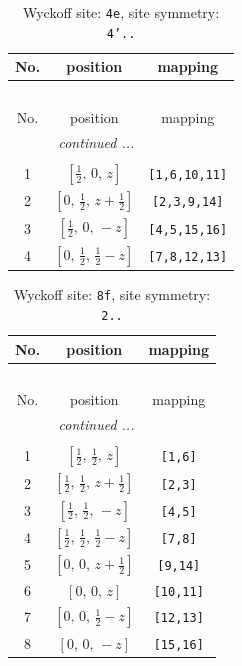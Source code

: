 \documentclass[fleqn,8pt]{jsarticle}
\begin{document}
\renewcommand{\arraystretch}{1.2}
\begin{longtable}{ccc}
\caption{Wyckoff site: {\tt 4e}, site symmetry: {\tt 4'..}}
 \\
 \hline \hline
No. & position & mapping \\ \hline \endfirsthead

\multicolumn{2}{l}{\tablename\ \thetable{}} \\
 \hline \hline
No. & position & mapping \\ \hline \endhead

 \hline \hline
\multicolumn{2}{r}{\footnotesize\it continued ...} \\ \endfoot

 \hline \hline
\multicolumn{2}{r}{} \\ \endlastfoot

1 & $\left[ \frac{1}{2},\, 0,\, z \right]$ & {\tt [1,6,10,11]} \\ \hline
2 & $\left[ 0,\, \frac{1}{2},\, z + \frac{1}{2} \right]$ & {\tt [2,3,9,14]} \\ \hline
3 & $\left[ \frac{1}{2},\, 0,\, - z \right]$ & {\tt [4,5,15,16]} \\ \hline
4 & $\left[ 0,\, \frac{1}{2},\, \frac{1}{2} - z \right]$ & {\tt [7,8,12,13]} \\
\end{longtable}
\renewcommand{\arraystretch}{1.2}
\begin{longtable}{ccc}
\caption{Wyckoff site: {\tt 8f}, site symmetry: {\tt 2..}}
 \\
 \hline \hline
No. & position & mapping \\ \hline \endfirsthead

\multicolumn{2}{l}{\tablename\ \thetable{}} \\
 \hline \hline
No. & position & mapping \\ \hline \endhead

 \hline \hline
\multicolumn{2}{r}{\footnotesize\it continued ...} \\ \endfoot

 \hline \hline
\multicolumn{2}{r}{} \\ \endlastfoot

1 & $\left[ \frac{1}{2},\, \frac{1}{2},\, z \right]$ & {\tt [1,6]} \\ \hline
2 & $\left[ \frac{1}{2},\, \frac{1}{2},\, z + \frac{1}{2} \right]$ & {\tt [2,3]} \\ \hline
3 & $\left[ \frac{1}{2},\, \frac{1}{2},\, - z \right]$ & {\tt [4,5]} \\ \hline
4 & $\left[ \frac{1}{2},\, \frac{1}{2},\, \frac{1}{2} - z \right]$ & {\tt [7,8]} \\ \hline
5 & $\left[ 0,\, 0,\, z + \frac{1}{2} \right]$ & {\tt [9,14]} \\ \hline
6 & $\left[ 0,\, 0,\, z \right]$ & {\tt [10,11]} \\ \hline
7 & $\left[ 0,\, 0,\, \frac{1}{2} - z \right]$ & {\tt [12,13]} \\ \hline
8 & $\left[ 0,\, 0,\, - z \right]$ & {\tt [15,16]} \\
\end{longtable}
\end{document}
